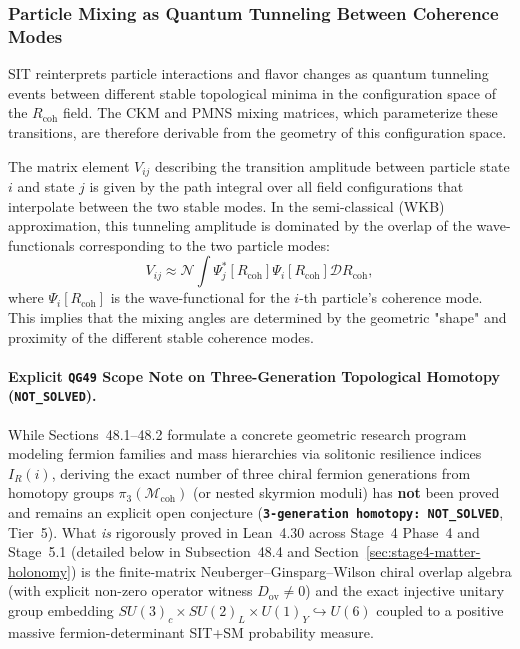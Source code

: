\subsubsection{Particle Mixing as Quantum Tunneling Between Coherence Modes}

SIT reinterprets particle interactions and flavor changes as quantum tunneling events between different stable topological minima in the configuration space of the $R_{\text{coh}}$ field. The CKM and PMNS mixing matrices, which parameterize these transitions, are therefore derivable from the geometry of this configuration space.

The matrix element $V_{ij}$ describing the transition amplitude between particle state $i$ and state $j$ is given by the path integral over all field configurations that interpolate between the two stable modes. In the semi-classical (WKB) approximation, this tunneling amplitude is dominated by the overlap of the wave-functionals corresponding to the two particle modes:
\begin{equation}
    V_{ij} \approx \mathcal{N} \int \Psi_j^*[R_{\text{coh}}] \Psi_i[R_{\text{coh}}] \mathcal{D}R_{\text{coh}},
    \label{eq:mixing_overlap_integral_consolidated}
\end{equation}
where $\Psi_i[R_{\text{coh}}]$ is the wave-functional for the $i$-th particle's coherence mode. This implies that the mixing angles are determined by the geometric "shape" and proximity of the different stable coherence modes.


\paragraph{Explicit \texttt{QG49} Scope Note on Three-Generation Topological Homotopy (\texttt{NOT\_SOLVED}).}
While Sections~48.1--48.2 formulate a concrete geometric research program modeling fermion families and mass hierarchies via solitonic resilience indices $I_R(i)$, deriving the exact number of three chiral fermion generations from homotopy groups $\pi_3(\mathcal{M}_{\mathrm{coh}})$ (or nested skyrmion moduli) has \textbf{not} been proved and remains an explicit open conjecture (\textbf{\texttt{3-generation homotopy: NOT\_\allowbreak{}SOLVED}}, Tier~5). What \emph{is} rigorously proved in Lean~4.30 across Stage~4 Phase~4 and Stage~5.1 (detailed below in Subsection~48.4 and Section~\ref{sec:stage4-matter-holonomy}) is the finite-matrix Neuberger--Ginsparg--Wilson chiral overlap algebra (with explicit non-zero operator witness $D_{\mathrm{ov}} \ne 0$) and the exact injective unitary group embedding $SU(3)_c \times SU(2)_L \times U(1)_Y \hookrightarrow U(6)$ coupled to a positive massive fermion-determinant SIT+SM probability measure.

